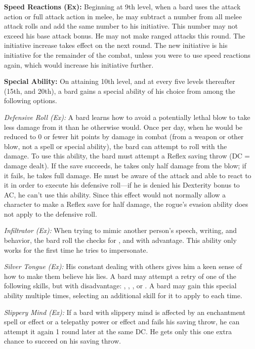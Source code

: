 \textbf{Speed Reactions (Ex):} Beginning at 9th level, when a bard uses the attack action or full attack action in melee, he may subtract a number from all melee attack rolls and add the same number to his initiative. This number may not exceed his base attack bonus. He may not make ranged attacks this round. The initiative increase takes effect on the next round. The new initiative is his initiative for the remainder of the combat, unless you were to use speed reactions again, which would increase his initiative further.

\textbf{Special Ability:} On attaining 10th level, and at every five levels thereafter (15th, and 20th), a bard gains a special ability of his choice from among the following options.

\textit{Defensive Roll (Ex):} A bard learns how to avoid a potentially lethal blow to take less damage from it than he otherwise would. Once per day, when he would be reduced to 0 or fewer hit points by damage in combat (from a weapon or other blow, not a spell or special ability), the bard can attempt to roll with the damage. To use this ability, the bard must attempt a Reflex saving throw (DC = damage dealt). If the save succeeds, he takes only half damage from the blow; if it fails, he takes full damage. He must be aware of the attack and able to react to it in order to execute his defensive roll---if he is denied his Dexterity bonus to AC, he can't use this ability. Since this effect would not normally allow a character to make a Reflex save for half damage, the rogue's evasion ability does not apply to the defensive roll.

\textit{Infiltrator (Ex):} When trying to mimic another person's speech, writing, and behavior, the bard roll the checks for ,  and  with advantage. This ability only works for the first time he tries to impersonate.

\textit{Silver Tongue (Ex):} His constant dealing with others gives him a keen sense of how to make them believe his lies. A bard may attempt a retry of one of the following skills, but with disadvantage: , , , or . A bard may gain this special ability multiple times, selecting an additional skill for it to apply to each time.

\textit{Slippery Mind (Ex):} If a bard with slippery mind is affected by an enchantment spell or effect or a telepathy power or effect and fails his saving throw, he can attempt it again 1 round later at the same DC. He gets only this one extra chance to succeed on his saving throw.

